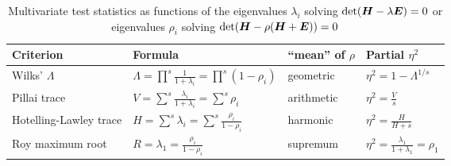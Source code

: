 %
%

\begin{table}[htb]
\renewcommand{\arraystretch}{1.6}
\caption{Multivariate test statistics as functions of the eigenvalues $\lambda_i$ solving $\mathrm{det} (\bm{H} - \lambda \bm{E})=0$
or eigenvalues $\rho_i$ solving  $\mathrm{det} (\bm{H} - \rho (\bm{H}+\bm{E}))=0$
}\label{tab:criteria}
\begin{center}
\begin{tabular}{|l|l|l|l|}
  \hline
  Criterion & Formula & ``mean'' of $\rho$ & Partial $\eta^2$   \\
  \hline
  Wilks' $\Lambda$ & $\Lambda = \prod^s \frac{1}{1+\lambda_i} = \prod^s (1-\rho_i)$ & geometric & $\eta^2 = 1-\Lambda^{1/s}$   \\
  Pillai trace & $V = \sum^s \frac{\lambda_i}{1+\lambda_i} = \sum^s \rho_i$ & arithmetic & $\eta^2 = \frac{V}{s} $   \\
  Hotelling-Lawley trace & $H = \sum^s \lambda_i = \sum^s \frac{\rho_i}{1-\rho_i} $ & harmonic & $\eta^2 = \frac{H}{H+s}$   \\
  Roy maximum root & $R = \lambda_1 = \frac{\rho_i}{1-\rho_i}$  & supremum & $ \eta^2 = \frac{\lambda_1}{1+\lambda_1} = \rho_1$   \\
  \hline
\end{tabular}
\end{center}
\end{table}
%
